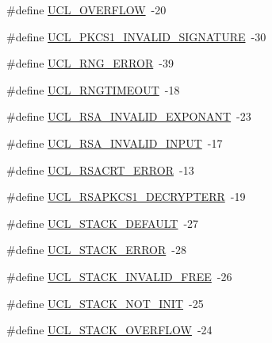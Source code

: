 \begin{DoxyCompactItemize}
\item 
\#define \hyperlink{group___u_c_l___r_e_t_u_r_n_gae4f4dea3ec4f9172974dc1158ba71b38}{U\+C\+L\+\_\+\+O\+V\+E\+R\+F\+L\+OW}~-\/20
\item 
\#define \hyperlink{group___u_c_l___r_e_t_u_r_n_gad99461b3bf6574c766b074bc99f1c501}{U\+C\+L\+\_\+\+P\+K\+C\+S1\+\_\+\+I\+N\+V\+A\+L\+I\+D\+\_\+\+S\+I\+G\+N\+A\+T\+U\+RE}~-\/30
\item 
\#define \hyperlink{group___u_c_l___r_e_t_u_r_n_gaf2ca12b46ed9910d0fd6c70684139269}{U\+C\+L\+\_\+\+R\+N\+G\+\_\+\+E\+R\+R\+OR}~-\/39
\item 
\#define \hyperlink{group___u_c_l___r_e_t_u_r_n_gab2e9fd4ffe6baddb05940f713925987d}{U\+C\+L\+\_\+\+R\+N\+G\+T\+I\+M\+E\+O\+UT}~-\/18
\item 
\#define \hyperlink{group___u_c_l___r_e_t_u_r_n_ga7d4404cb6bde42e7db505a2d5a743e44}{U\+C\+L\+\_\+\+R\+S\+A\+\_\+\+I\+N\+V\+A\+L\+I\+D\+\_\+\+E\+X\+P\+O\+N\+A\+NT}~-\/23
\item 
\#define \hyperlink{group___u_c_l___r_e_t_u_r_n_ga414889da044b1fb5b75bddbbcaa5c1db}{U\+C\+L\+\_\+\+R\+S\+A\+\_\+\+I\+N\+V\+A\+L\+I\+D\+\_\+\+I\+N\+P\+UT}~-\/17
\item 
\#define \hyperlink{group___u_c_l___r_e_t_u_r_n_ga4dc44a3e019d63cdc495c3bd16db6896}{U\+C\+L\+\_\+\+R\+S\+A\+C\+R\+T\+\_\+\+E\+R\+R\+OR}~-\/13
\item 
\#define \hyperlink{group___u_c_l___r_e_t_u_r_n_ga25d316534793eaa2df377427d259ac84}{U\+C\+L\+\_\+\+R\+S\+A\+P\+K\+C\+S1\+\_\+\+D\+E\+C\+R\+Y\+P\+T\+E\+RR}~-\/19
\item 
\#define \hyperlink{group___u_c_l___r_e_t_u_r_n_gaa1cd90433b369b79056ecaaf7061f6ad}{U\+C\+L\+\_\+\+S\+T\+A\+C\+K\+\_\+\+D\+E\+F\+A\+U\+LT}~-\/27
\item 
\#define \hyperlink{group___u_c_l___r_e_t_u_r_n_ga7e7f411c20b460de9d77ac3612f21112}{U\+C\+L\+\_\+\+S\+T\+A\+C\+K\+\_\+\+E\+R\+R\+OR}~-\/28
\item 
\#define \hyperlink{group___u_c_l___r_e_t_u_r_n_gaed949439b5c3cd443b511320c649d43e}{U\+C\+L\+\_\+\+S\+T\+A\+C\+K\+\_\+\+I\+N\+V\+A\+L\+I\+D\+\_\+\+F\+R\+EE}~-\/26
\item 
\#define \hyperlink{group___u_c_l___r_e_t_u_r_n_ga2346c721ea6b4512d78a6ab6111f86a2}{U\+C\+L\+\_\+\+S\+T\+A\+C\+K\+\_\+\+N\+O\+T\+\_\+\+I\+N\+IT}~-\/25
\item 
\#define \hyperlink{group___u_c_l___r_e_t_u_r_n_ga67bcb682a8d0dfd2bcc2f8f632757901}{U\+C\+L\+\_\+\+S\+T\+A\+C\+K\+\_\+\+O\+V\+E\+R\+F\+L\+OW}~-\/24
\item 

\end{DoxyCompactItemize}
